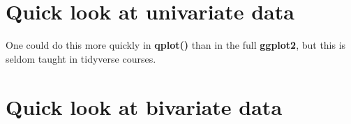 \documentclass[11pt]{article}
\begin{document}
\section*{Quick look at univariate data}


\begin{parcolumns}[rulebetween=true]{2}


\hspace{0.1in}


\end{parcolumns}

\bigskip

One could do this more quickly in \textbf{qplot()} than in the full
\textbf{ggplot2}, but this is seldom taught in tidyverse courses.


\section*{Quick look at bivariate data}
\end{document}
